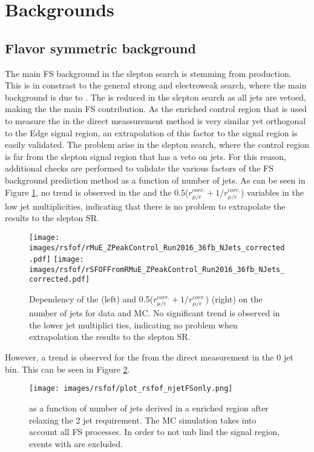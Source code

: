 \section{Backgrounds}
\noindent
\justify
\subsection*{Flavor symmetric background}
\noindent
\justify
The main FS background in the slepton search is stemming from \PWW production.
This is in constrast to the general strong and electroweak search, where the main background is due to \ttbar.
The \ttbar is reduced in the slepton search as all jets are vetoed, making the \PWW the main FS contribution.
As the \ttbar enriched control region that is used to measure the \Rsfof in the direct meassurement method is very similar yet orthogonal to the Edge signal region, an extrapolation of this factor to     the signal region is easily validated.
The problem arise in the slepton search, where the \ttbar control region is far from the slepton signal region that has a veto on jets.
For this reason, additional checks are performed to validate the various factors of the FS background prediction method as a function of number of jets.
As can be seen in Figure \ref{fig:rmueSlepton}, no trend is observed in the \rmue and the 0.5($r_{\mu/e}^{corr.}+1/r_{\mu/e}^{corr.}$) variables in the low jet multiplicities, indicating that there is     no problem to extrapolate the results to the slepton SR.
\begin{figure}[htbp!]
\begin{center}
    \texttt{[image: images/rsfof/rMuE\_ZPeakControl\_Run2016\_36fb\_NJets\_corrected.pdf]}
    \texttt{[image: images/rsfof/rSFOFFromRMuE\_ZPeakControl\_Run2016\_36fb\_NJets\_corrected.pdf]}
    \caption{Dependency of the \rmue (left) and 0.5($r_{\mu/e}^{corr.}+1/r_{\mu/e}^{corr.}$) (right) on the number of jets for data and MC. No significant trend is observed in the lower jet multiplici    ties, indicating no problem when extrapolation the results to the slepton SR.}
\label{fig:rmueSlepton}
\end{center}
\end{figure}
However, a trend is observed for the \Rsfof from the direct measurement in the 0 jet bin. This can be seen in Figure \ref{fig:rsfofSleptonOne}.
\begin{figure}[htbp!]
\begin{center}
    \texttt{[image: images/rsfof/plot\_rsfof\_njetFSonly.png]}
    \caption{\Rsfof as a function of number of jets derived in a \ttbar enriched region after relaxing the 2 jet requirement. The MC simulation takes into account all FS processes. In order to not unb    lind the signal region, events with are excluded.}
\label{fig:rsfofSleptonOne}
\end{center}
\end{figure} 
